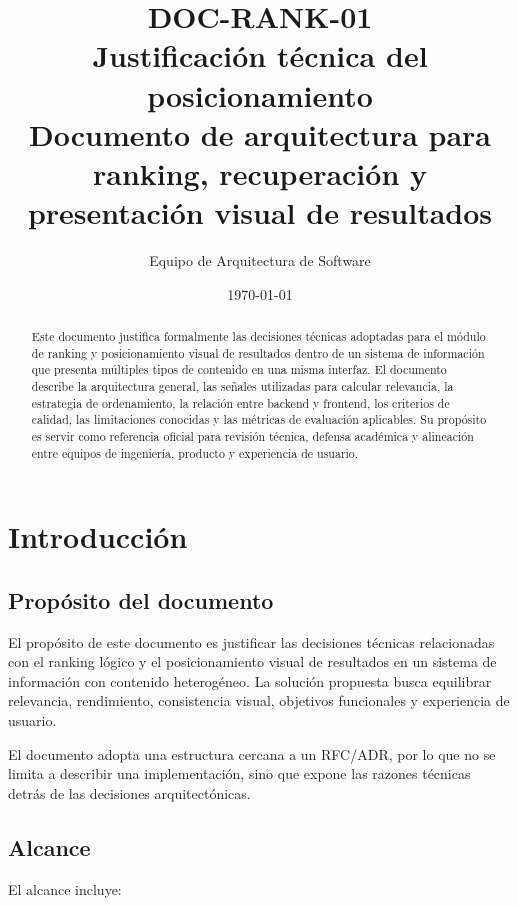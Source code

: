 \documentclass[12pt,a4paper]{article}
\title{
    \textbf{DOC-RANK-01}\\
    Justificación técnica del posicionamiento\\
    \large Documento de arquitectura para ranking, recuperación y presentación visual de resultados
}
\author{Equipo de Arquitectura de Software}
\date{\today}
\begin{document}
\maketitle

\begin{abstract}
Este documento justifica formalmente las decisiones técnicas adoptadas para el módulo de ranking y posicionamiento visual de resultados dentro de un sistema de información que presenta múltiples tipos de contenido en una misma interfaz. El documento describe la arquitectura general, las señales utilizadas para calcular relevancia, la estrategia de ordenamiento, la relación entre backend y frontend, los criterios de calidad, las limitaciones conocidas y las métricas de evaluación aplicables. Su propósito es servir como referencia oficial para revisión técnica, defensa académica y alineación entre equipos de ingeniería, producto y experiencia de usuario.
\end{abstract}

\tableofcontents
\newpage

\section{Introducción}

\subsection{Propósito del documento}

El propósito de este documento es justificar las decisiones técnicas relacionadas con el ranking lógico y el posicionamiento visual de resultados en un sistema de información con contenido heterogéneo. La solución propuesta busca equilibrar relevancia, rendimiento, consistencia visual, objetivos funcionales y experiencia de usuario.

El documento adopta una estructura cercana a un RFC/ADR, por lo que no se limita a describir una implementación, sino que expone las razones técnicas detrás de las decisiones arquitectónicas.

\subsection{Alcance}

El alcance incluye:
\end{document}
